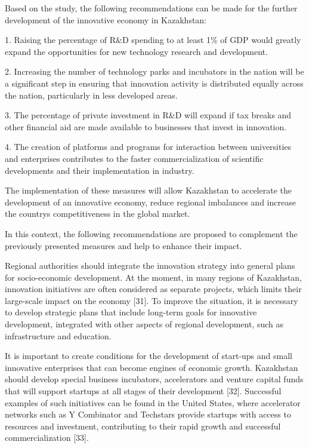 \begin{multicols}{2}
Based on the study, the following recommendations can be made for the
further development of the innovative economy in Kazakhstan:


1.
  Raising the percentage of R\&D spending to at least 1\% of GDP would
  greatly expand the opportunities for new technology research and
  development.

2.
  Increasing the number of technology parks and incubators in the nation
  will be a significant step in ensuring that innovation activity is
  distributed equally across the nation, particularly in less developed
  areas.

3.
  The percentage of private investment in R\&D will expand if tax breaks
  and other financial aid are made available to businesses that invest
  in innovation.

4.
  The creation of platforms and programs for interaction between
  universities and enterprises contributes to the faster
  commercialization of scientific developments and their implementation
  in industry.

The implementation of these measures will allow Kazakhstan to accelerate
the development of an innovative economy, reduce regional imbalances and
increase the country\textquotesingle s competitiveness in the global
market.

In this context, the following recommendations are proposed to
complement the previously presented measures and help to enhance their
impact.

Regional authorities should integrate the innovation strategy into
general plans for socio-economic development. At the moment, in many
regions of Kazakhstan, innovation initiatives are often considered as
separate projects, which limits their large-scale impact on the economy
{[}31{]}. To improve the situation, it is necessary to develop strategic
plans that include long-term goals for innovative development,
integrated with other aspects of regional development, such as
infrastructure and education.

It is important to create conditions for the development of start-ups
and small innovative enterprises that can become engines of economic
growth. Kazakhstan should develop special business incubators,
accelerators and venture capital funds that will support startups at all
stages of their development {[}32{]}. Successful examples of such
initiatives can be found in the United States, where accelerator
networks such as Y Combinator and Techstars provide startups with access
to resources and investment, contributing to their rapid growth and
successful commercialization {[}33{]}.


\end{multicols}
